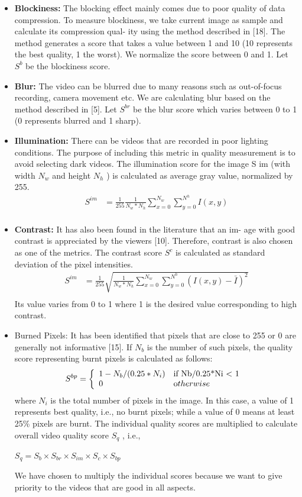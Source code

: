 \documentclass{sig-alternate-05-2015}
\begin{document}
\begin{itemize}
\item \textbf{Blockiness: }The blocking effect mainly comes due to poor
quality of data compression. To measure blockiness, we take
current image as sample and calculate its compression qual-
ity using the method described in [18]. The method generates
a score that takes a value between 1 and 10 (10 represents the
best quality, 1 the worst). We normalize the score between 0
and 1. Let $S^b$ be the blockiness score.
\item \textbf{Blur:} The video can be blurred due to many reasons such as
out-of-focus recording, camera movement etc. We are calculating blur based on the method described in [5]. Let $S^{br}$ be the blur score which varies between 0 to 1 (0 represents blurred and 1 sharp).
\item \textbf{Illumination:} There can be videos that are recorded in poor
lighting conditions. The purpose of including this metric in
quality measurement is to avoid selecting dark videos. The
illumination score for the image S im (with width $N_w$ and
height $N_h$ ) is calculated as average gray value, normalized
by 255.
\begin{align*}
S^{im}&= \frac{1}{255}\frac{1}{N_w*N_h}\sum_{x=0}^{N_w}\sum_{y=0}^{N^h}I(x,y)\\
\end{align*}
\item \textbf{Contrast:} It has also been found in the literature that an im-
age with good contrast is appreciated by the viewers [10].
Therefore, contrast is also chosen as one of the metrics. The
contrast score $S^c$ is calculated as standard deviation of the
pixel intensities.
\begin{align*}
S^{im}&= \frac{1}{255}\sqrt{\frac{1}{N_w*N_h}\sum_{x=0}^{N_w}\sum_{y=0}^{N^h}(I(x,y)-\bar{I})^2}\\
\end{align*}
Its value varies from 0 to 1 where 1 is the desired value corresponding to high contrast.
\item Burned Pixels: It has been identified that pixels that are
close to 255 or 0 are generally not informative [15]. If $N_b$
is the number of such pixels, the quality score representing
burnt pixels is calculated as follows: 
\begin{align*}
S^{bp} =          
\left\{
	\begin{array}{ll}
		1-N_b/(0.25*N_i)  & \mbox{if Nb/{0.25*Ni} < 1 } \\
		0 & \mbox otherwise
	\end{array}
\right.
\end{align*}
where $N_i$ is the total number of pixels in the image. In this
case, a value of 1 represents best quality, i.e., no burnt pixels;
while a value of 0 means at least 25\% pixels are burnt.
The individual quality scores are multiplied to calculate overall
video quality score $S_q$ , i.e.,
\begin{center}
$S_q = S_b \times S_{br} \times S_{im} \times S_c \times S_{bp}$
\end{center}
We have chosen to multiply the individual scores because we
want to give priority to the videos that are good in all aspects.
\end{itemize}
\end{document}
